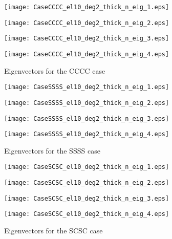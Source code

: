 \documentclass[preprint,12pt]{elsarticle}
\begin{document}
\begin{figure}[p]%
	\texttt{[image: CaseCCCC\_el10\_deg2\_thick\_n\_eig\_1.eps]}
	\caption*{$\widehat{\omega}_{11}$}\label{fig:CCCC1}%
	\endminipage
	\texttt{[image: CaseCCCC\_el10\_deg2\_thick\_n\_eig\_2.eps]}
	\caption*{$\widehat{\omega}_{21}$}\label{fig:CCCC2}%
	\endminipage
	\texttt{[image: CaseCCCC\_el10\_deg2\_thick\_n\_eig\_3.eps]}
	\caption*{$\widehat{\omega}_{12}$}\label{fig:CCCC3}%
	\endminipage
	\texttt{[image: CaseCCCC\_el10\_deg2\_thick\_n\_eig\_4.eps]}
	\caption*{$\widehat{\omega}_{22}$}\label{fig:CCCC4}%
	\endminipage
	\caption[Eigenvectors for CCCC]{Eigenvectors for the CCCC case}%
	\label{fig:CCCC}%
\end{figure}
\begin{figure}[p]%
	\texttt{[image: CaseSSSS\_el10\_deg2\_thick\_n\_eig\_1.eps]}
	\caption*{$\widehat{\omega}_{11}$}\label{fig:SSSS1}%
	\endminipage
	\texttt{[image: CaseSSSS\_el10\_deg2\_thick\_n\_eig\_2.eps]}
	\caption*{$\widehat{\omega}_{21}$}\label{fig:SSSS2}%
	\endminipage
	\texttt{[image: CaseSSSS\_el10\_deg2\_thick\_n\_eig\_3.eps]}
	\caption*{$\widehat{\omega}_{12}$}\label{fig:SSSS3}%
	\endminipage 
	\texttt{[image: CaseSSSS\_el10\_deg2\_thick\_n\_eig\_4.eps]}
	\caption*{$\widehat{\omega}_{22}$}\label{fig:SSSS4}%
	\endminipage
	\caption[Eigenvectors for CCCC]{Eigenvectors for the SSSS case}%
	\label{fig:SSSS}%
\end{figure}
\begin{figure}[p]%
	\texttt{[image: CaseSCSC\_el10\_deg2\_thick\_n\_eig\_1.eps]}
	\caption*{$\widehat{\omega}_{11}$}\label{fig:SCSC1}%
	\endminipage
	\texttt{[image: CaseSCSC\_el10\_deg2\_thick\_n\_eig\_2.eps]}
	\caption*{$\widehat{\omega}_{21}$}\label{fig:SCSC2}%
	\endminipage
	\texttt{[image: CaseSCSC\_el10\_deg2\_thick\_n\_eig\_3.eps]}
	\caption*{$\widehat{\omega}_{12}$}\label{fig:SCSC3}%
	\endminipage 
	\texttt{[image: CaseSCSC\_el10\_deg2\_thick\_n\_eig\_4.eps]}
	\caption*{$\widehat{\omega}_{22}$}\label{fig:SCSC4}%
	\endminipage
	\caption[Eigenvectors for CCCC]{Eigenvectors for the SCSC case}%
	\label{fig:SCSC}%
\end{figure}
\end{document}
